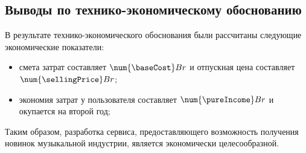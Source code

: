 \subsection{Выводы по технико-экономическому обоснованию}
В результате технико-экономического обоснования были рассчитаны следующие экономические показатели:

\begin{itemize}
  \item смета затрат составляет $ \num{\baseCost} \byr{}$ и отпускная цена составляет $ \num{\sellingPrice} \byr{}$;
  \item экономия затрат у пользователя составляет $ \num{\pureIncome} \byr{}$ и окупается на второй год;
\end{itemize}

Таким образом, разработка сервиса, предоставляющего возможность получения новинок музыкальной индустрии, является экономически целесообразной.
